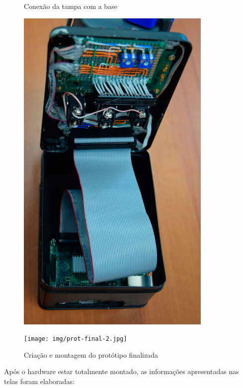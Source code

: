 \documentclass[
		12pt,				%
		openright,			%
		oneside,			%
		a4paper,			%
		chapter=TITLE,		%
		english,			%
		brazil				%
	]{abntex2}
\begin{document}
\begin{figure}[htb]
	\centering
 	\begin{minipage}{0.45\textwidth}
		\centering
		\caption{\label{fig:tampa-base}Conexão da tampa com a base}
		\includegraphics[width=0.84\textwidth]{img/tampa-base.jpg}
	\end{minipage}
	\hfill
	\begin{minipage}{0.45\textwidth}
		\centering
		\caption{\label{fig:prot-final}Criação e montagem do protótipo finalizada}
		\texttt{[image: img/prot-final-2.jpg]}
	\end{minipage}
\end{figure}

Após o hardware estar totalmente montado, as informações apresentadas nas telas foram elaboradas:
\end{document}
